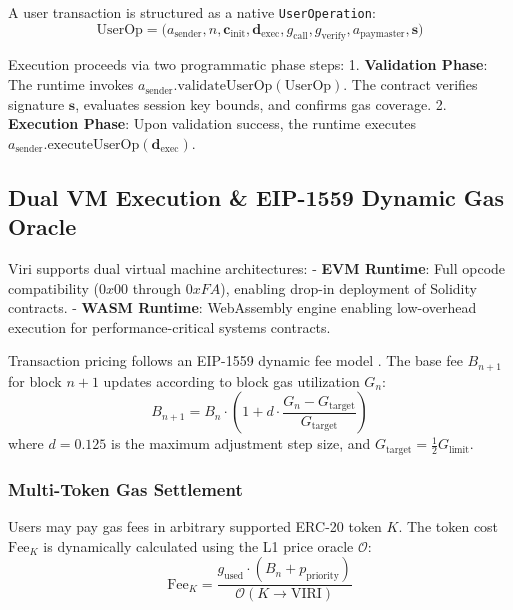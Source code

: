 \documentclass[10pt,journal,compsoc,twocolumn]{IEEEtran}
\begin{document}
A user transaction is structured as a native \texttt{UserOperation}:
\begin{equation}
\text{UserOp} = \Big( a_{\text{sender}}, n, \mathbf{c}_{\text{init}}, \mathbf{d}_{\text{exec}}, g_{\text{call}}, g_{\text{verify}}, a_{\text{paymaster}}, \mathbf{s} \Big)
\end{equation}

Execution proceeds via two programmatic phase steps:
1. \textbf{Validation Phase}: The runtime invokes $a_{\text{sender}}.\text{validateUserOp}(\text{UserOp})$. The contract verifies signature $\mathbf{s}$, evaluates session key bounds, and confirms gas coverage.
2. \textbf{Execution Phase}: Upon validation success, the runtime executes $a_{\text{sender}}.\text{executeUserOp}(\mathbf{d}_{\text{exec}})$.

\subsection{Dual VM Execution \& EIP-1559 Dynamic Gas Oracle}
Viri supports dual virtual machine architectures:
- \textbf{EVM Runtime}: Full opcode compatibility ($0x00$ through $0xFA$), enabling drop-in deployment of Solidity contracts.
- \textbf{WASM Runtime}: WebAssembly engine enabling low-overhead execution for performance-critical systems contracts.

Transaction pricing follows an EIP-1559 dynamic fee model \cite{buterin2020eip1559}. The base fee $B_{n+1}$ for block $n+1$ updates according to block gas utilization $G_n$:
\begin{equation}
B_{n+1} = B_n \cdot \left( 1 + d \cdot \frac{G_n - G_{\text{target}}}{G_{\text{target}}} \right)
\label{eq:eip1559}
\end{equation}
where $d = 0.125$ is the maximum adjustment step size, and $G_{\text{target}} = \frac{1}{2} G_{\text{limit}}$.

\subsubsection{Multi-Token Gas Settlement}
Users may pay gas fees in arbitrary supported ERC-20 token $K$. The token cost $\text{Fee}_K$ is dynamically calculated using the L1 price oracle $\mathcal{O}$:
\begin{equation}
\text{Fee}_K = \frac{g_{\text{used}} \cdot \left( B_n + p_{\text{priority}} \right)}{\mathcal{O}(K \rightarrow \text{VIRI})}
\label{eq:multitoken}
\end{equation}
\end{document}
